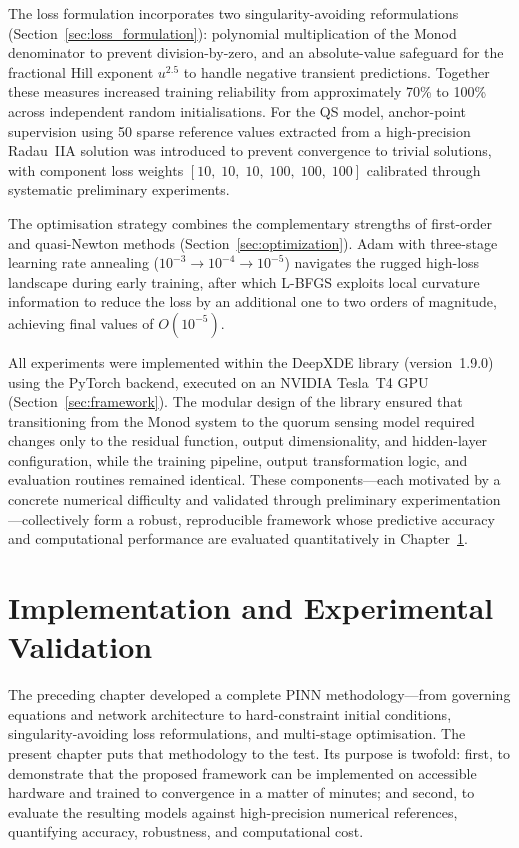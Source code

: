 \documentclass[14pt,a4paper,openany]{extbook}
\begin{document}
The loss formulation incorporates two singularity-avoiding reformulations (Section~\ref{sec:loss_formulation}): polynomial multiplication of the Monod denominator to prevent division-by-zero, and an absolute-value safeguard for the fractional Hill exponent $u^{2.5}$ to handle negative transient predictions. Together these measures increased training reliability from approximately 70\% to 100\% across independent random initialisations. For the QS model, anchor-point supervision using 50 sparse reference values extracted from a high-precision Radau~IIA solution was introduced to prevent convergence to trivial solutions, with component loss weights $[10,\; 10,\; 10,\; 100,\; 100,\; 100]$ calibrated through systematic preliminary experiments.

The optimisation strategy combines the complementary strengths of first-order and quasi-Newton methods (Section~\ref{sec:optimization}). Adam with three-stage learning rate annealing ($10^{-3} \to 10^{-4} \to 10^{-5}$) navigates the rugged high-loss landscape during early training, after which L-BFGS exploits local curvature information to reduce the loss by an additional one to two orders of magnitude, achieving final values of $O(10^{-5})$.

All experiments were implemented within the DeepXDE library (version~1.9.0) using the PyTorch backend, executed on an NVIDIA Tesla~T4 GPU (Section~\ref{sec:framework}). The modular design of the library ensured that transitioning from the Monod system to the quorum sensing model required changes only to the residual function, output dimensionality, and hidden-layer configuration, while the training pipeline, output transformation logic, and evaluation routines remained identical.
These components---each motivated by a concrete numerical difficulty and validated through preliminary experimentation---collectively form a robust, reproducible framework whose predictive accuracy and computational performance are evaluated quantitatively in Chapter~\ref{chap:implementation}.
\chapter{Implementation and Experimental Validation}
\label{chap:implementation}

The preceding chapter developed a complete PINN methodology---from governing equations and network architecture to hard-constraint initial conditions, singularity-avoiding loss reformulations, and multi-stage optimisation. The present chapter puts that methodology to the test. Its purpose is twofold: first, to demonstrate that the proposed framework can be implemented on accessible hardware and trained to convergence in a matter of minutes; and second, to evaluate the resulting models against high-precision numerical references, quantifying accuracy, robustness, and computational cost.
\end{document}
